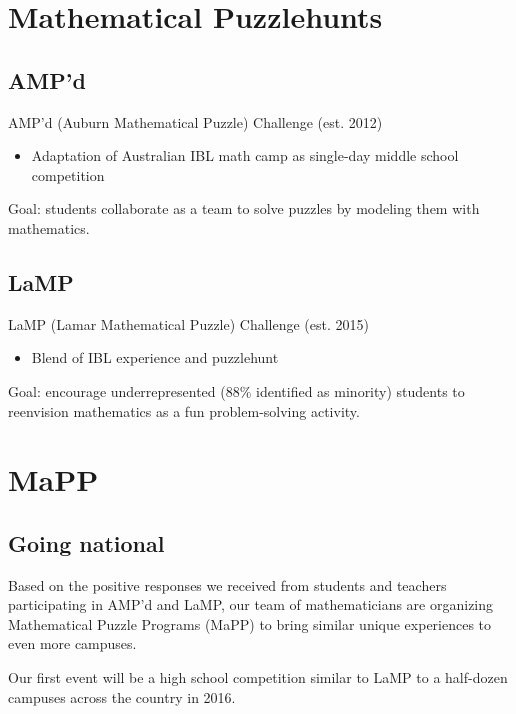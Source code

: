 \documentclass{beamer}
\newcommand{\vpause}{\pause\vspace{1em}}
\begin{document}
\section{Mathematical Puzzlehunts}

\subsection{AMP'd}

\begin{frame}
  AMP'd (Auburn Mathematical Puzzle) Challenge (est. 2012)
  \begin{itemize}
    \item Adaptation of Australian IBL math camp
          as single-day middle school competition
  \end{itemize}

  \vpause

  Goal: students collaborate as a team to solve puzzles by modeling them
  with mathematics.
\end{frame}

\subsection{LaMP}

\begin{frame}
  LaMP (Lamar Mathematical Puzzle) Challenge (est. 2015)
  \begin{itemize}
    \item Blend of IBL experience and puzzlehunt
  \end{itemize}

  \vpause

  Goal: encourage underrepresented (88\% identified as minority)
  students to reenvision mathematics as a fun problem-solving
  activity.
\end{frame}

\section{MaPP}

\subsection{Going national}

\begin{frame}
  Based on the positive responses we received from students and
  teachers participating in AMP'd and LaMP, our team of mathematicians
  are organizing Mathematical Puzzle Programs (MaPP) to bring similar
  unique experiences to even more campuses.

  \vpause

  Our first event will be a high school competition similar to LaMP
  to a half-dozen campuses across the country in 2016.
\end{frame}
\end{document}
